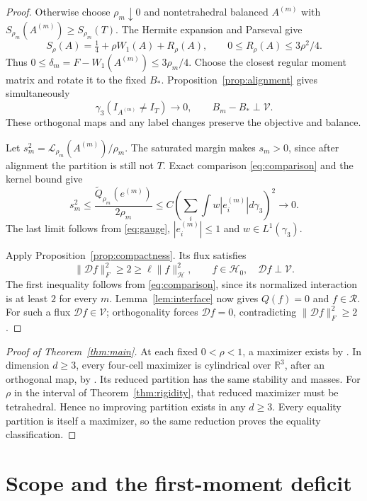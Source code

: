 \documentclass[11pt,reqno]{amsart}
\theoremstyle{remark}
\newcommand{\R}{\mathbb R}
\newcommand{\norm}[1]{\lVert #1\rVert}
\newcommand{\ga}{\gamma}
\newcommand{\LL}{\mathcal L}
\newcommand{\HH}{\mathcal H}
\newcommand{\DD}{\mathcal D}
\newcommand{\VV}{\mathcal V}
\newcommand{\RR}{\mathcal R}
\begin{document}
\begin{proof}
Otherwise choose $\rho_m\downarrow0$ and nontetrahedral balanced
$A^{(m)}$ with $S_{\rho_m}(A^{(m)})\ge S_{\rho_m}(T)$.
The Hermite expansion and Parseval give
\[
 S_\rho(A)=\tfrac14+\rho W_1(A)+R_\rho(A),\qquad
 0\le R_\rho(A)\le3\rho^2/4.
\]
Thus $0\le\delta_m=F-W_1(A^{(m)})\le3\rho_m/4$.
Choose the closest regular moment matrix and rotate it to the fixed $B_*$.
Proposition~\ref{prop:alignment} gives simultaneously
\begin{equation}\label{eq:gauge}
 \ga_3(I_{A^{(m)}}\ne I_T)\to0,\qquad B_m-B_*\perp\VV.
\end{equation}
These orthogonal maps and any label changes preserve the objective and balance.

Let $s_m^2=\LL_{\rho_m}(A^{(m)})/\rho_m$.
The saturated margin makes $s_m>0$, since after alignment the partition
is still not $T$. Exact comparison \eqref{eq:comparison} and the kernel
bound give
\begin{equation}\label{eq:scale}
 s_m^2\le\frac{\widetilde Q_{\rho_m}(e^{(m)})}{2\rho_m}
 \le C\left(\sum_i\int w|e_i^{(m)}|d\ga_3\right)^2\longrightarrow0.
\end{equation}
The last limit follows from \eqref{eq:gauge}, $|e_i^{(m)}|\le1$
and $w\in L^1(\ga_3)$.

Apply Proposition~\ref{prop:compactness}. Its flux satisfies
\[
 \norm{\DD f}_F^2\ge2\ge\ell\norm{f}_{\HH}^2,
 \qquad f\in\HH_0,\quad\DD f\perp\VV.
\]
The first inequality follows from \eqref{eq:comparison}, since its
normalized interaction is at least $2$ for every $m$.
Lemma~\ref{lem:interface} now gives $Q(f)=0$ and $f\in\RR$.
For such a flux $\DD f\in\VV$; orthogonality forces $\DD f=0$,
contradicting $\norm{\DD f}_F^2\ge2$.
\end{proof}

\begin{proof}[Proof of Theorem~\ref{thm:main}]
At each fixed $0<\rho<1$, a maximizer exists by
\cite[Lemma~2.3]{HT}. In dimension $d\ge3$, every four-cell maximizer
is cylindrical over $\R^3$, after an orthogonal map, by
\cite[Theorem~1.9]{HT}. Its reduced partition has the same stability
and masses. For $\rho$ in the interval of Theorem~\ref{thm:rigidity},
that reduced maximizer must be tetrahedral. Hence no improving partition
exists in any $d\ge3$. Every equality partition is itself a maximizer,
so the same reduction proves the equality classification.
\end{proof}

\section{Scope and the first-moment deficit}
\end{document}
